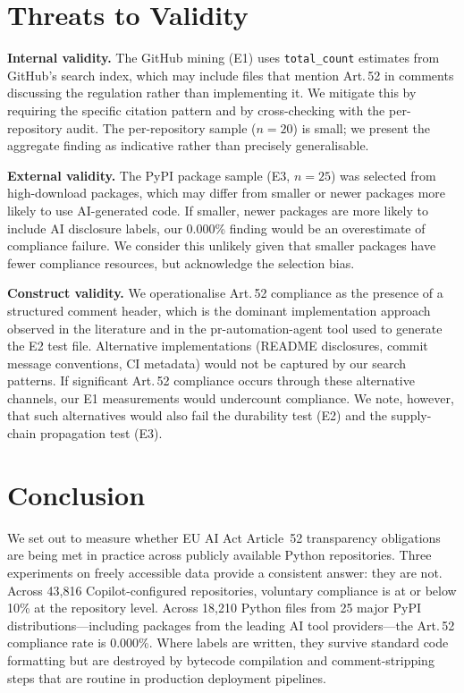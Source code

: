 \documentclass[conference]{IEEEtran}
\begin{document}
\section{Threats to Validity}
\label{sec:threats}

\textbf{Internal validity.}  The GitHub mining (E1) uses
\texttt{total\_count} estimates from GitHub's search index, which may
include files that mention Art.\,52 in comments discussing the
regulation rather than implementing it.  We mitigate this by requiring
the specific citation pattern and by cross-checking with the
per-repository audit.  The per-repository sample ($n{=}20$) is small;
we present the aggregate finding as indicative rather than precisely
generalisable.

\textbf{External validity.}  The PyPI package sample (E3, $n{=}25$) was
selected from high-download packages, which may differ from smaller or
newer packages more likely to use AI-generated code.  If smaller, newer
packages are more likely to include AI disclosure labels, our 0.000\%
finding would be an overestimate of compliance failure.  We consider this
unlikely given that smaller packages have fewer compliance resources, but
acknowledge the selection bias.

\textbf{Construct validity.}  We operationalise Art.\,52 compliance as
the presence of a structured comment header, which is the dominant
implementation approach observed in the literature and in the
pr-automation-agent tool used to generate the E2 test file.  Alternative
implementations (README disclosures, commit message conventions, CI
metadata) would not be captured by our search patterns.  If significant
Art.\,52 compliance occurs through these alternative channels, our E1
measurements would undercount compliance.  We note, however, that such
alternatives would also fail the durability test (E2) and the
supply-chain propagation test (E3).

\section{Conclusion}
\label{sec:conclusion}

We set out to measure whether EU AI Act Article~52 transparency
obligations are being met in practice across publicly available Python
repositories.  Three experiments on freely accessible data provide a
consistent answer: they are not.  Across 43,816 Copilot-configured
repositories, voluntary compliance is at or below 10\% at the repository
level.  Across 18,210 Python files from 25 major PyPI
distributions---including packages from the leading AI tool
providers---the Art.\,52 compliance rate is 0.000\%.  Where labels are
written, they survive standard code formatting but are destroyed by
bytecode compilation and comment-stripping steps that are routine in
production deployment pipelines.
\end{document}
